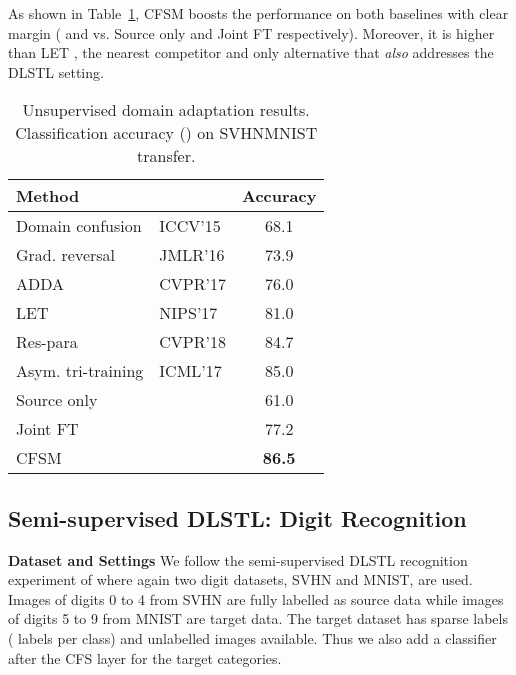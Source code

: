 \documentclass[letterpaper]{article} \usepackage{aaai19}  \usepackage{times}  \usepackage{helvet}  \usepackage{courier}  \usepackage{url}  \usepackage{graphicx}
\newcommand{\keypoint}[1]{\noindent\textbf{#1}\quad}
\begin{document}
As shown in Table~\ref{tab:UDA_svhn_mnist}, CFSM boosts the performance on both baselines with clear margin ( and  vs. Source only and Joint FT respectively). Moreover, it is  higher than LET \cite{label_eff_open_da_2017}, the nearest competitor and only alternative that \emph{also} addresses the DLSTL setting.


\begin{table}[t]
\centering
\small
\begin{tabular}{llc}
\hline
Method           &       &Accuracy \\ \hline
Domain confusion & ICCV'15 & 68.1    \\
Grad. reversal   & JMLR'16 & 73.9    \\
ADDA             & CVPR'17 & 76.0    \\
LET	             & NIPS'17 & 81.0    \\ 
Res-para         & CVPR'18 & 84.7    \\ 
Asym. tri-training     & ICML'17 & 85.0    \\ \hline
Source only      &  & 61.0    \\
Joint FT         &  & 77.2    \\
CFSM             &  & {\bf 86.5}    \\ \hline
\end{tabular}
\caption{Unsupervised domain adaptation results. Classification accuracy () on SVHNMNIST transfer.}
\label{tab:UDA_svhn_mnist}
\end{table}

\subsection{Semi-supervised DLSTL: Digit Recognition}\label{Sec:DLSTL_category}
\begin{comment}
\textcolor{red}{Now we use one network branch while \cite{label_eff_open_da_2017} are with two branches, source and target respectively. Though we can achieves better results with smaller model size, it would be better to follow the architecture as in \cite{label_eff_open_da_2017}. Otherwise, we may no need to point out such difference on architecture.}
\end{comment}
\keypoint{Dataset and Settings} We follow the semi-supervised DLSTL recognition experiment of \cite{label_eff_open_da_2017} where again two digit  datasets, SVHN and MNIST, are used. Images of digits 0 to 4 from SVHN are fully labelled as source data while images of digits 5 to 9 from MNIST are target data. The target dataset has sparse labels ( labels per class) and unlabelled images available. Thus we also add a classifier  after the CFS layer  for the target categories. 
\end{document}
